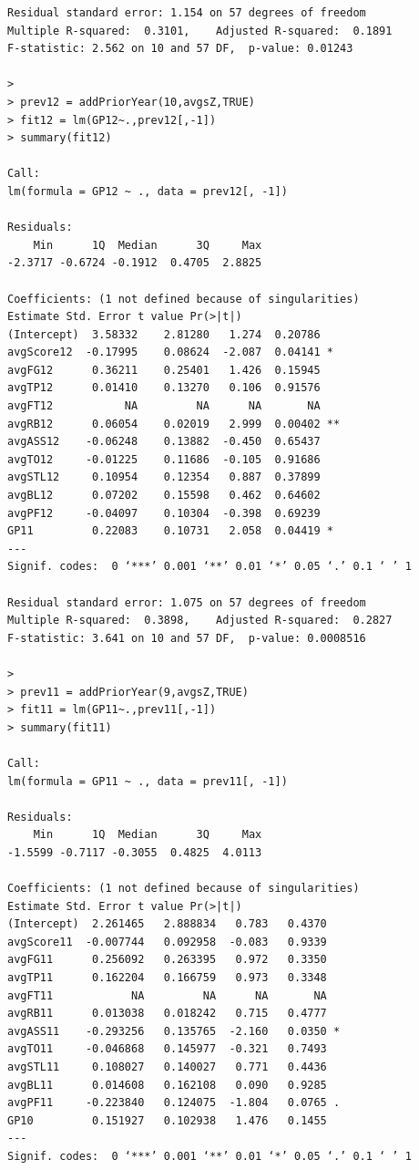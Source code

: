 \documentclass[]{scrartcl}
\begin{document}
\begin{verbatim}
Residual standard error: 1.154 on 57 degrees of freedom
Multiple R-squared:  0.3101,	Adjusted R-squared:  0.1891 
F-statistic: 2.562 on 10 and 57 DF,  p-value: 0.01243

> 
> prev12 = addPriorYear(10,avgsZ,TRUE)
> fit12 = lm(GP12~.,prev12[,-1])
> summary(fit12)

Call:
lm(formula = GP12 ~ ., data = prev12[, -1])

Residuals:
    Min      1Q  Median      3Q     Max 
-2.3717 -0.6724 -0.1912  0.4705  2.8825 

Coefficients: (1 not defined because of singularities)
Estimate Std. Error t value Pr(>|t|)   
(Intercept)  3.58332    2.81280   1.274  0.20786   
avgScore12  -0.17995    0.08624  -2.087  0.04141 * 
avgFG12      0.36211    0.25401   1.426  0.15945   
avgTP12      0.01410    0.13270   0.106  0.91576   
avgFT12           NA         NA      NA       NA   
avgRB12      0.06054    0.02019   2.999  0.00402 **
avgASS12    -0.06248    0.13882  -0.450  0.65437   
avgTO12     -0.01225    0.11686  -0.105  0.91686   
avgSTL12     0.10954    0.12354   0.887  0.37899   
avgBL12      0.07202    0.15598   0.462  0.64602   
avgPF12     -0.04097    0.10304  -0.398  0.69239   
GP11         0.22083    0.10731   2.058  0.04419 * 
---
Signif. codes:  0 ‘***’ 0.001 ‘**’ 0.01 ‘*’ 0.05 ‘.’ 0.1 ‘ ’ 1

Residual standard error: 1.075 on 57 degrees of freedom
Multiple R-squared:  0.3898,	Adjusted R-squared:  0.2827 
F-statistic: 3.641 on 10 and 57 DF,  p-value: 0.0008516

> 
> prev11 = addPriorYear(9,avgsZ,TRUE)
> fit11 = lm(GP11~.,prev11[,-1])
> summary(fit11)

Call:
lm(formula = GP11 ~ ., data = prev11[, -1])

Residuals:
    Min      1Q  Median      3Q     Max 
-1.5599 -0.7117 -0.3055  0.4825  4.0113 

Coefficients: (1 not defined because of singularities)
Estimate Std. Error t value Pr(>|t|)  
(Intercept)  2.261465   2.888834   0.783   0.4370  
avgScore11  -0.007744   0.092958  -0.083   0.9339  
avgFG11      0.256092   0.263395   0.972   0.3350  
avgTP11      0.162204   0.166759   0.973   0.3348  
avgFT11            NA         NA      NA       NA  
avgRB11      0.013038   0.018242   0.715   0.4777  
avgASS11    -0.293256   0.135765  -2.160   0.0350 *
avgTO11     -0.046868   0.145977  -0.321   0.7493  
avgSTL11     0.108027   0.140027   0.771   0.4436  
avgBL11      0.014608   0.162108   0.090   0.9285  
avgPF11     -0.223840   0.124075  -1.804   0.0765 .
GP10         0.151927   0.102938   1.476   0.1455  
---
Signif. codes:  0 ‘***’ 0.001 ‘**’ 0.01 ‘*’ 0.05 ‘.’ 0.1 ‘ ’ 1


\end{verbatim}
\end{document}
